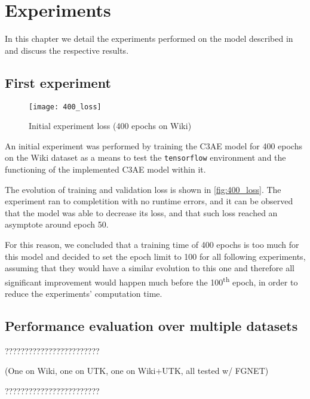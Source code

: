 
\chapter{Experiments}
In this chapter we detail the experiments performed on the model described in
 and discuss the respective results.

\section{First experiment}

\begin{wrapfigure}[17]{r}{0.5\textwidth}
    \centering
    \texttt{[image: 400\_loss]}
    \caption{Initial experiment loss (400 epochs on Wiki)}
    \label{fig:400_loss}
\end{wrapfigure}

An initial experiment was performed by training the C3AE model for
400 epochs on the Wiki dataset as a means to test the \texttt{tensorflow} environment
and the functioning of the implemented C3AE model within it.

The evolution of training and validation loss is shown in \autoref{fig:400_loss}.
The experiment ran to completition with no runtime errors, and
it can be observed that the model was able to decrease its loss,
and that such loss reached an asymptote around epoch 50.

For this reason, we concluded that a training time of 400 epochs
is too much for this model and decided to set the epoch limit to 100 for
all following experiments, assuming that they would have a similar
evolution to this one and therefore all significant improvement
would happen much before the 100\textsuperscript{th} epoch,
in order to reduce the experiments' computation time.

\section{Performance evaluation over multiple datasets}
????????????????????????

(One on Wiki, one on UTK, one on Wiki+UTK, all tested w/ FGNET)

????????????????????????

